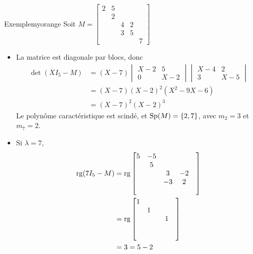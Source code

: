     \begin{omed}{Exemple}{myorange}
        Soit $M = \begin{bmatrix}
            2 & 5 & & & \\
            & 2 & & & \\
            & & 4 & 2 & \\
            & & 3 & 5 & \\
            & & & & 7 
        \end{bmatrix}$
        \begin{itemize}
            \item La matrice est diagonale par blocs, donc 
            \begin{align*}
                \det(X I_5 - M) 
                &= (X - 7) \begin{vmatrix}
                    X - 2 & 5 \\
                    0 & X - 2 
                \end{vmatrix} \begin{vmatrix}
                    X- 4 & 2 \\
                    3 & X - 5
                \end{vmatrix} \\
                &= (X - 7) (X - 2)^2 (X^2 - 9 X - 6) \\
                &= (X-7)^2 (X-2)^3
            \end{align*}
            Le polynôme caractéristique est scindé, et $\operatorname{Sp}(M) = \left\{2,7\right\}$, avec $m_2 = 3$ et $m_7 = 2$.
            \item Si $\lambda = 7$,
            \begin{align*}
                \operatorname{rg}(7 I_5 - M )
                &= \operatorname{rg}\begin{bmatrix}
                    5 & -5 & & & \\
                     & 5 & & & \\
                    & & 3 & -2 & \\
                    & & -3 & 2 & \\
                    & & & & 
                \end{bmatrix} \\
                &= \operatorname{rg}\begin{bmatrix}
                    1 &  & & & \\
                     & 1 & & & \\
                    & &  & 1 & \\
                    & &  &  & \\
                    & & & & 
                \end{bmatrix} \\
                &= 3 = 5 - 2
            \end{align*}
            

\end{itemize}
\end{omed}
